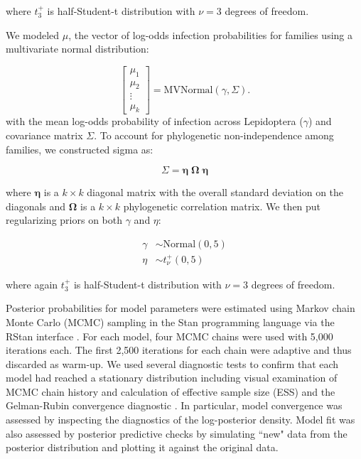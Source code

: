 \documentclass{frontiersSCNS} %
\begin{document}
where $t_{3}^{+}$ is half-Student-t distribution with $\nu=3$ degrees of freedom. 

We modeled $\mu$, the vector of log-odds infection probabilities for families using a multivariate normal distribution:

\begin{equation}
	\begin{bmatrix}
		\mu_{1} \\
        \mu_{2} \\
        \vdots \\
        \mu_{k}
	\end{bmatrix}
    = 
    \textrm{MVNormal}(\gamma, \Sigma).
\end{equation}
with the mean log-odds probability of infection across Lepidoptera ($\gamma$) and covariance matrix $\Sigma$. To account for phylogenetic non-independence among families, we constructed sigma as:

\begin{equation}
	\Sigma = \boldsymbol{\eta} \;	\boldsymbol{\Omega} \; \boldsymbol{\eta}
\end{equation}

where $\boldsymbol{\eta}$ is a $k \times k$ diagonal matrix with the overall standard deviation on the diagonals and $\boldsymbol{\Omega}$ is a $k \times k$ phylogenetic correlation matrix. We then put regularizing priors on both $\gamma$ and $\eta$:

\begin{align}
	\gamma 	&\sim \mathrm{Normal}(0, 5) \nonumber \\
	\eta   	&\sim t_{\nu}^{+}(0,5)
\end{align}

where again $t_{3}^{+}$ is half-Student-t distribution with $\nu=3$ degrees of freedom. 

Posterior probabilities for model parameters were estimated using Markov chain Monte Carlo (MCMC) sampling in the Stan programming language \citep{Carpenter:2016aa} via the RStan interface \citep{stan:2016aa}. For each model, four MCMC chains were used with 5,000 iterations each. The first 2,500 iterations for each chain were adaptive and thus discarded as warm-up. We used several diagnostic tests to confirm that each model had reached a stationary distribution including visual examination of MCMC chain history and calculation of effective sample size (ESS) and the Gelman-Rubin convergence diagnostic \citep[$\hat{R}$; ][]{Gelman:1992aa,Brooks:1998aa}. In particular, model convergence was assessed by inspecting the diagnostics of the log-posterior density. Model fit was also assessed by posterior predictive checks by simulating ``new" data from the posterior distribution and plotting it against the original data. %
\end{document}
